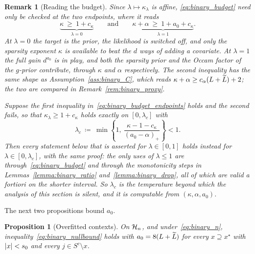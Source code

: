 \documentclass[aos]{imsart}%
\DeclarePairedDelimiter{\abs}{\lvert}{\rvert}
\theoremstyle{plain}
\newtheorem{proposition}{Proposition}[section]
\newtheorem{remark}{Remark}[section]
\theoremstyle{definition}
\begin{document}
    \begin{remark}[Reading the budget]
        \label{rem:binary_budget}
        Since $\lambda\mapsto\kappa_\lambda$ is affine,
        \eqref{eq:binary_budget} need only be checked at the two endpoints,
        where it reads
        \begin{equation}
            \label{eq:binary_budget_endpoints}
            \underbrace{\kappa\ \geq\ 1+c_\kappa}_{\lambda=0}
            \qquad\text{and}\qquad
            \underbrace{\kappa+\alpha\ \geq\ 1+a_0+c_\kappa}_{\lambda=1}.
        \end{equation}
        At $\lambda=0$ the target is the prior, the likelihood is switched off,
        and only the sparsity exponent $\kappa$ is available to beat the $d$
        ways of adding a covariate. At $\lambda=1$ the full gain $d^{a_0}$ is
        in play, and both the sparsity prior and the Occam factor of the
        $g$-prior contribute, through $\kappa$ and $\alpha$ respectively. The
        second inequality has the same shape as
        Assumption~\ref{ass:binary_C}, which reads
        $\kappa+\alpha\geq c_\alpha(L+\widetilde{L})+2$; the two are compared in
        Remark~\ref{rem:binary_proxy}.

        Suppose the first inequality in~\eqref{eq:binary_budget_endpoints}
        holds and the second fails, so that $\kappa_\lambda\geq1+c_\kappa$
        holds exactly on $[0,\lambda_c]$ with
        \begin{equation}
            \label{eq:binary_lambdac}
            \lambda_c\ \coloneq\ \min\left\{1,\
            \frac{\kappa-1-c_\kappa}{(a_0-\alpha)_{+}}\right\}<1 .
        \end{equation}
        Then every statement below that is asserted for $\lambda\in[0,1]$
        holds instead for $\lambda\in[0,\lambda_c]$, with the same proof: the
        only uses of $\lambda\leq1$ are through~\eqref{eq:binary_budget} and
        through the monotonicity steps in Lemmas~\ref{lemma:binary_ratio}
        and~\ref{lemma:binary_drop}, all of which are valid a fortiori on the
        shorter interval. So $\lambda_c$ is the temperature beyond which the
        analysis of this section is silent, and it is computable from
        $(\kappa,\alpha,a_0)$.
    \end{remark}

    The next two propositions bound $a_0$.

    \begin{proposition}[Overfitted contexts]
        \label{prop:binary_null_over}
        On $\mathcal{H}_n$, and under~\eqref{eq:binary_n},
        inequality~\eqref{eq:binary_nullbound} holds with
        $a_0=8(L+\widetilde{L})$ for every $x\supseteq x^{\star}$ with $\abs x<s_0$ and
        every $j\in S^{c}\setminus x$.
    \end{proposition}
\end{document}
